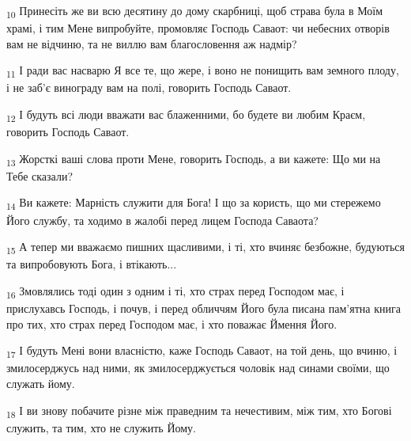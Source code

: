 \begin{tcolorbox}
\textsubscript{10} Принесіть же ви всю десятину до дому скарбниці, щоб страва була в Моїм храмі, і тим Мене випробуйте, промовляє Господь Саваот: чи небесних отворів вам не відчиню, та не виллю вам благословення аж надмір?
\end{tcolorbox}
\begin{tcolorbox}
\textsubscript{11} І ради вас насварю Я все те, що жере, і воно не понищить вам земного плоду, і не заб'є винограду вам на полі, говорить Господь Саваот.
\end{tcolorbox}
\begin{tcolorbox}
\textsubscript{12} І будуть всі люди вважати вас блаженними, бо будете ви любим Краєм, говорить Господь Саваот.
\end{tcolorbox}
\begin{tcolorbox}
\textsubscript{13} Жорсткі ваші слова проти Мене, говорить Господь, а ви кажете: Що ми на Тебе сказали?
\end{tcolorbox}
\begin{tcolorbox}
\textsubscript{14} Ви кажете: Марність служити для Бога! І що за користь, що ми стережемо Його службу, та ходимо в жалобі перед лицем Господа Саваота?
\end{tcolorbox}
\begin{tcolorbox}
\textsubscript{15} А тепер ми вважаємо пишних щасливими, і ті, хто вчиняє безбожне, будуються та випробовують Бога, і втікають...
\end{tcolorbox}
\begin{tcolorbox}
\textsubscript{16} Змовлялись тоді один з одним і ті, хто страх перед Господом має, і прислухавсь Господь, і почув, і перед обличчям Його була писана пам'ятна книга про тих, хто страх перед Господом має, і хто поважає Ймення Його.
\end{tcolorbox}
\begin{tcolorbox}
\textsubscript{17} І будуть Мені вони власністю, каже Господь Саваот, на той день, що вчиню, і змилосерджусь над ними, як змилосерджується чоловік над синами своїми, що служать йому.
\end{tcolorbox}
\begin{tcolorbox}
\textsubscript{18} І ви знову побачите різне між праведним та нечестивим, між тим, хто Богові служить, та тим, хто не служить Йому.
\end{tcolorbox}
